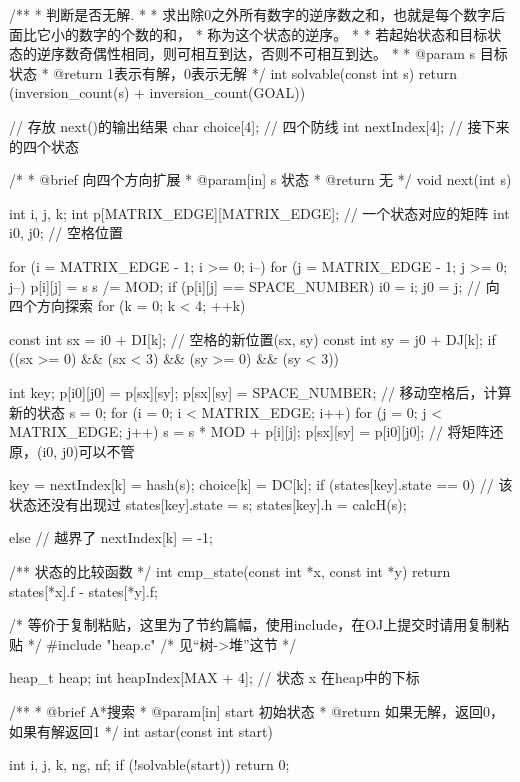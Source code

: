\begin{Codex}[label=eight_digits_astar.c]
/**
 * 判断是否无解.
 *
 * 求出除0之外所有数字的逆序数之和，也就是每个数字后面比它小的数字的个数的和，
 * 称为这个状态的逆序。
 *
 * 若起始状态和目标状态的逆序数奇偶性相同，则可相互到达，否则不可相互到达。
 *
 * @param s 目标状态
 * @return 1表示有解，0表示无解
 */
int solvable(const int s) {
    return (inversion_count(s) + inversion_count(GOAL)) %
}

// 存放 next()的输出结果
char choice[4]; // 四个防线
int nextIndex[4]; // 接下来的四个状态

/*
 * @brief 向四个方向扩展
 * @param[in] s 状态
 * @return 无
 */
void next(int s) {
    int i, j, k;
    int p[MATRIX_EDGE][MATRIX_EDGE]; // 一个状态对应的矩阵
    int i0, j0;  // 空格位置

    for (i = MATRIX_EDGE - 1; i >= 0; i--) {
        for (j = MATRIX_EDGE - 1; j >= 0; j--) {
            p[i][j] = s %
            s /= MOD;
            if (p[i][j] == SPACE_NUMBER) {
                i0 = i;
                j0 = j;
            }
        }
    }
    // 向四个方向探索
    for (k = 0; k < 4; ++k) {
        const int sx = i0 + DI[k]; // 空格的新位置(sx, sy)
        const int sy = j0 + DJ[k];
        if ((sx >= 0) && (sx < 3) && (sy >= 0) && (sy < 3)) {
            int key;
            p[i0][j0] = p[sx][sy];
            p[sx][sy] = SPACE_NUMBER;
            // 移动空格后，计算新的状态
            s = 0;
            for (i = 0; i < MATRIX_EDGE; i++)
                for (j = 0; j < MATRIX_EDGE; j++)
                    s = s * MOD + p[i][j];
            p[sx][sy] = p[i0][j0]; // 将矩阵还原，(i0, j0)可以不管

            key = nextIndex[k] = hash(s);
            choice[k] = DC[k];
            if (states[key].state == 0) { // 该状态还没有出现过
                states[key].state = s;
                states[key].h = calcH(s);
            }
        } else {// 越界了
            nextIndex[k] = -1;
        }
    }
}

/** 状态的比较函数 */
int cmp_state(const int *x, const int *y) {
    return states[*x].f - states[*y].f;
}

/* 等价于复制粘贴，这里为了节约篇幅，使用include，在OJ上提交时请用复制粘贴 */
#include "heap.c"  /* 见“树->堆”这节 */

heap_t heap;
int heapIndex[MAX + 4]; // 状态 x 在heap中的下标

/**
 * @brief A*搜索
 * @param[in] start 初始状态
 * @return 如果无解，返回0，如果有解返回1
 */
int astar(const int start) {
    int i, j, k, ng, nf;
    if (!solvable(start)) return 0;

}
\end{Codex}
